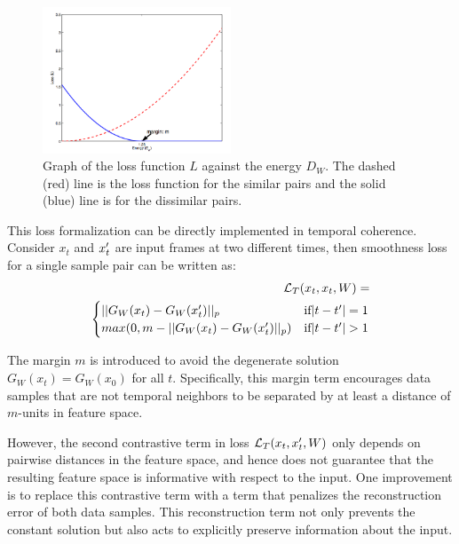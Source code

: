 \begin{figure}
\centering
\includegraphics[width=0.5\textwidth]{images/twoloss.png}
\caption{Graph of the loss function $L$ against the energy $D_W$. The dashed (red) line is the loss function for the similar pairs and the solid (blue) line is for the dissimilar pairs.}
\label{fig:twoloss}
\end{figure}

This loss formalization can be directly implemented in temporal coherence. Consider $x_t$ and $x_t\rq{}$ are input frames at two different times, then smoothness loss for a single sample pair can be written as:
\begin{equation}
\begin{split}
\lagr_T(x_t, x_t, W) = \\
     \begin{cases}
        ||G_W(x_t) - G_W(x_t\rq{})||_p & \text{if} |t-t\rq{}| = 1\\
        max(0, m - ||G_W(x_t) - G_W(x_t\rq{})||_p) &\text{if} |t-t\rq{}| > 1 \\
    \end{cases}
\end{split}
\end{equation}

The margin $m$ is introduced to avoid the degenerate solution $G_W(x_t) = G_W(x_0)$ for all $t$. 
Specifically, this margin term encourages data samples that are not temporal neighbors to be separated by at least a distance of $m$-units in feature space. 

However, the second contrastive term in loss $\lagr_T(x_t, x_t\rq{}, W)$ only depends on pairwise distances in the feature space, and hence does not guarantee that the resulting feature space is informative with respect to the input. 
One improvement is to replace this contrastive term with a term that penalizes the reconstruction error of both data samples. 
This reconstruction term not only prevents the constant solution but also acts to explicitly preserve information about the input.

